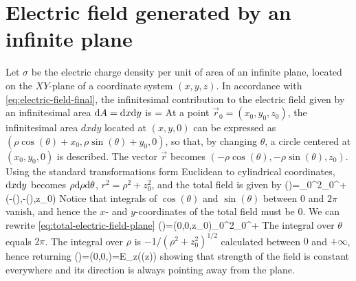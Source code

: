 \section{Electric field generated by an infinite plane}
Let $\sigma$ be the electric charge density per unit of area of an infinite plane, located on the $XY$-plane of a coordinate system $(x,y,z)$. In accordance with \ref{eq:electric-field-final}, the infinitesimal contribution to the electric field given by an infinitesimal area $\mathrm{d}A=\mathrm{d}x\mathrm{d}y$ is
\be
{}=
\ee
At a point $\vec{r}_{0}=(x_{0},y_{0},z_{0})$, the infinitesimal area $dxdy$ located at $(x,y,0)$ can be expressed as $(\rho\cos(\theta)+x_{0},\rho\sin(\theta)+y_{0},0)$, so that, by changing $\theta$, a circle centered at $(x_{0},y_{0},0)$ is described. The vector $\vec{r}$ becomes $(-\rho\cos(\theta),-\rho\sin(\theta),z_{0})$.
Using the standard transformations form Euclidean to cylindrical coordinates, $\mathrm{d}x\mathrm{d}y$ becomes $\rho\mathrm{d}\rho\mathrm{d}\theta$, $r^{2}=\rho^{2}+z_{0}^{2}$, and the total field is given by 
\be\label{eq:total-electric-field-plane}
()=\int_{0}^{2\pi}\total{\theta}\int_{0}^{+\infty}\total{\rho}(-\rho\cos(\theta),-\rho\sin(\theta),z_{0})
\ee
Notice that integrals of $\cos(\theta)$ and $\sin(\theta)$ between $0$ and $2\pi$ vanish, and hence the $x$- and $y$-coordinates of the total field must be $0$. We can rewrite \ref{eq:total-electric-field-plane}
\be\label{eq:total-electric-field-plane-simplified}
()=(0,0,z_{0})\int_{0}^{2\pi}\total{\theta}\int_{0}^{+\infty}\total{\rho}
\ee
The integral over $\theta$ equals $2\pi$. The integral over $\rho$ is $-1/(\rho^{2}+z_{0}^{2})^{1/2}$ calculated between $0$ and $+\infty$, hence returning
\be\label{eq:total-electric-field-plane-final}
()=(0,0,)=E_{z}(\sign(z))
\ee
showing that strength of the field is constant everywhere and its direction is always pointing away from the plane.